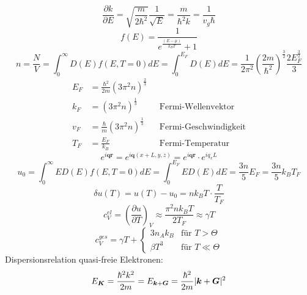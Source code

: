 \documentclass[11pt]{article}
\DeclarePairedDelimiter\abs{\lvert}{\rvert}
\begin{document}
\begin{equation}
  \frac{\partial k}{\partial E}=\sqrt{\frac{m}{2\hbar^2}}\frac{1}{\sqrt{E}}=
  \frac{m}{\hbar^2k}=\frac{1}{v_g\hbar}
\end{equation}
\begin{equation}
  f(E)=\frac{1}{e^{\frac{(E-\mu)}{k_BT}}+1}
\end{equation}
\begin{equation}
  n=\frac{N}{V}=\int_0^\infty D(E)f(E,T=0)dE=\int_0^{E_F}D(E)dE=\frac{1}{2\pi^2}
  \left( \frac{2m}{\hbar^2}\right)^{\frac{3}{2}}\frac{2E_F^{\frac{3}{2}}}{3}
\end{equation}
\begin{equation}
  \begin{align}
    E_F&=\frac{\hbar^2}{2m}(3\pi^2n)^{\frac{2}{3}} \\
    k_F&=(3\pi^2n)^{\frac{1}{3}}\quad &\text{Fermi-Wellenvektor} \\
    v_F&=\frac{\hbar}{m}(3\pi^2n)^{\frac{1}{3}}\quad &\text{Fermi-Geschwindigkeit} \\
    T_F&=\frac{E_F}{k_B}\quad &\text{Fermi-Temperatur}
  \end{align}
\end{equation}
\begin{equation}
  e^{i\bm{q}\bm{r}}=e^{i\bm{q}(x+L,y,z)}=e^{i\bm{q}\bm{r}}\cdot e^{iq_xL}
\end{equation}
\begin{equation}
  u_0=\int_0^\infty ED(E)f(E,T=0)dE=\int_0^{E_F}ED(E)dE=\frac{3n}{5}E_F=
  \frac{3n}{5}k_BT_F
\end{equation}
\begin{equation}
  \delta u(T)=u(T)-u_0=nk_BT\cdot\frac{T}{T_F}
\end{equation}
\begin{equation}
  c_V^{el}=\left(\frac{\partial u}{\partial T}\right)_V\approx\frac{\pi^2nk_BT}{2T_F}
  \approx\gamma T
\end{equation}
\begin{equation}
  c_V^{ges}=\gamma T + \begin{cases}
  3n_Ak_B & \text{für } T>\Theta \\
  \beta T^3 & \text{für } T\ll\Theta
  \end{cases}
\end{equation}
Dispersionsrelation quasi-freie Elektronen:
\begin{equation}
  E_{\bm{K}}=\frac{\hbar^2k^2}{2m}=E_{\bm{k}+\bm{G}}=\frac{\hbar^2}{2m}
  \abs{\bm{k}+\bm{G}}^2
\end{equation}
\end{document}
